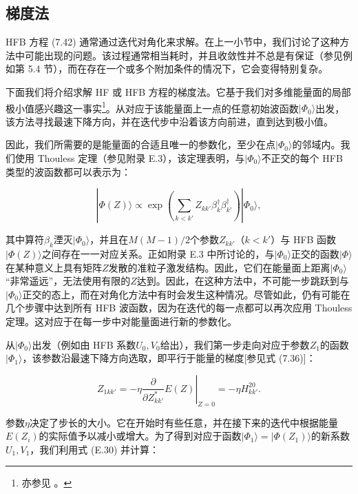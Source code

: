 \subsection{梯度法\label{subsec:=0068AF=005EA6=006CD5}}

HFB 方程 (7.42) 通常通过迭代对角化来求解。在上一小节中，我们讨论了这种方法中可能出现的问题。该过程通常相当耗时，并且收敛性并不总是有保证（参见例如第
5.4 节），而在存在一个或多个附加条件的情况下，它会变得特别复杂。

下面我们将介绍求解 HF 或 HFB 方程的梯度法\cite{MSR76,EMR80a}。它基于我们对多维能量面的局部极小值感兴趣这一事实\footnote{亦参见 \cite{Mc56,Mc60,BTR77}。}。从对应于该能量面上一点的任意初始波函数$|\Phi_{0}\rangle$出发，该方法寻找最速下降方向，并在迭代步中沿着该方向前进，直到达到极小值。

因此，我们所需要的是能量面的合适且唯一的参数化，至少在点$|\Phi_{0}\rangle$的邻域内。我们使用 Thouless
定理（参见附录 E.3），该定理表明，与$|\Phi_{0}\rangle$不正交的每个 HFB 类型的波函数都可以表示为：

\begin{equation}
|\Phi(Z)\rangle\propto\exp\left(\sum_{k<k'}Z_{kk'}\beta^{\dagger}_{k}\beta^{\dagger}_{k'}\right)|\Phi_{0}\rangle,\label{eq:thouless_representation_hfb}
\end{equation}

其中算符$\beta_{k}$湮灭$|\Phi_{0}\rangle$，并且在$M(M-1)/2$个参数$Z_{kk'}$（$k<k'$）与
HFB 函数$|\Phi(Z)\rangle$之间存在一一对应关系。正如附录 E.3 中所讨论的，与$|\Phi_{0}\rangle$正交的函数$|\Phi\rangle$在某种意义上具有矩阵$Z$发散的准粒子激发结构。因此，它们在能量面上距离$|\Phi_{0}\rangle$“非常遥远”，无法使用有限的$Z$达到。因此，在这种方法中，不可能一步跳跃到与$|\Phi_{0}\rangle$正交的态上，而在对角化方法中有时会发生这种情况。尽管如此，仍有可能在几个步骤中达到所有
HFB 波函数，因为在迭代的每一点都可以再次应用 Thouless 定理。这对应于在每一步中对能量面进行新的参数化。

从$|\Phi_{0}\rangle$出发（例如由 HFB 系数$U_{0},V_{0}$给出），我们第一步走向对应于参数$Z_{1}$的函数$|\Phi_{1}\rangle$，该参数沿最速下降方向选取，即平行于能量的梯度{[}参见式
(7.36){]}：

\begin{equation}
Z_{1kk'}=-\eta\left.\frac{\partial}{\partial Z^{*}_{kk'}}E(Z)\right|_{Z=0}=-\eta H^{20}_{kk'}.\label{eq:gradient_step_z1}
\end{equation}

参数$\eta$决定了步长的大小。它在开始时有些任意，并在接下来的迭代中根据能量$E(Z_{i})$的实际值予以减小或增大。为了得到对应于函数$|\Phi_{1}\rangle=|\Phi(Z_{1})\rangle$的新系数$U_{1},V_{1}$，我们利用式
(E.30) 并计算：

